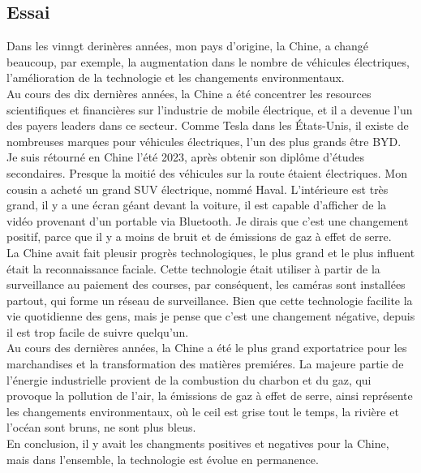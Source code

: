 \documentclass{book}
\begin{document}
        \subsection{Essai}
            Dans les vinngt derinères années, mon pays d'origine, la Chine, a changé beaucoup, 
            par exemple, la augmentation dans le nombre de véhicules électriques, l'amélioration de la technologie et 
            les changements environmentaux.
            \\
            Au cours des dix dernières années, la Chine a été concentrer les resources scientifiques et financières sur l'industrie de mobile électrique,
            et il a devenue l'un des payers leaders dans ce secteur. Comme Tesla dans les États-Unis, 
            il existe de nombreuses marques pour véhicules électriques, l'un des plus grands être BYD. 
            Je suis rétourné en Chine l'été 2023, après obtenir son diplôme d'études secondaires. 
            Presque la moitié des véhicules sur la route étaient électriques. Mon cousin a acheté un grand SUV électrique, nommé Haval.
            L'intérieure est très grand, il y a une écran géant devant la voiture, il est capable d'afficher de la vidéo provenant d'un portable via Bluetooth.
            Je dirais que c'est une changement positif, parce que il y a moins de bruit et de émissions de gaz à effet de serre.
            \\
            La Chine avait fait pleusir progrès technologiques, le plus grand et le plus influent était la reconnaissance faciale.
            Cette technologie était utiliser à partir de la surveillance au paiement des courses, par conséquent, les caméras sont installées partout,
            qui forme un réseau de surveillance. Bien que cette technologie facilite la vie quotidienne des gens, 
            mais je pense que c'est une changement négative, depuis il est trop facile de suivre quelqu'un. 
            \\
            Au cours des dernières années, la Chine a été le plus grand exportatrice pour les marchandises et la transformation des matières premiéres.
            La majeure partie de l'énergie industrielle provient de la combustion du charbon et du gaz, 
            qui provoque la pollution de l'air, la émissions de gaz à effet de serre, ainsi représente les changements environmentaux,
            où le ceil est grise tout le temps, la rivière et l'océan sont bruns, ne sont plus bleus.
            \\
            En conclusion, il y avait les changments positives et negatives pour la Chine, mais dans l'ensemble, 
            la technologie est évolue en permanence.
\end{document}
